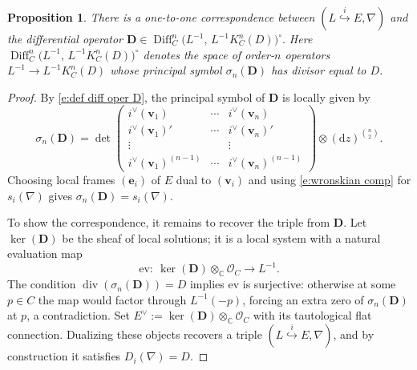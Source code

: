 \documentclass[twoside, 11pt]{article}
\numberwithin{equation}{section}
\theoremstyle{theorem}
\numberwithin{theorem}{section}
\newtheorem{proposition}[proposition]{Proposition}
\theoremstyle{definition}
\begin{document}
\begin{proposition}\label{SL diff oper}
There is a one-to-one correspondence between $(L \overset{i}{\hookrightarrow} E, \nabla)$ and the differential operator
\(
\mathbf{D}\in \operatorname{Diff}_C^{n} \bigl(L^{-1},\,L^{-1}K_C^{n}(D)\bigr)^\circ.
\)
Here $\operatorname{Diff}^{n}_{C} \bigl(L^{-1},\,L^{-1}K_C^{n}(D)\bigr)^{\circ}$ denotes the space of order-$n$ operators
$L^{-1}\to L^{-1}K_C^{n}(D)$
whose principal symbol $\sigma_n(\mathbf{D})$ has divisor equal to $D$.
\end{proposition}
\begin{proof}
By \eqref{e:def diff oper D}, the principal symbol of $\mathbf{D}$ is locally given by
\begin{equation}\label{eqn-principal-symbol}
\sigma_n(\mathbf{D})
=\det \begin{pmatrix}
i^\vee(\mathbf{v}_1) & \cdots & i^\vee(\mathbf{v}_n)\\
i^\vee(\mathbf{v}_1)' & \cdots & i^\vee(\mathbf{v}_n)'\\
\vdots & & \vdots\\
i^\vee(\mathbf{v}_1)^{(n-1)} & \cdots & i^\vee(\mathbf{v}_n)^{(n-1)}
\end{pmatrix}\otimes (\mathrm{d}z)^{\binom{n}{2}}.
\end{equation}
Choosing local frames $(\mathbf{e}_i)$ of $E$ dual to $(\mathbf{v}_i)$ and using \eqref{e:wronskian comp} for $s_i(\nabla)$ gives $\sigma_n(\mathbf{D})=s_i(\nabla)$. 

To show the correspondence, it remains to recover the triple from $\mathbf{D}$. Let $\ker(\mathbf{D})$ be the sheaf of local solutions; it is a local system with a natural evaluation map
\[
\mathrm{ev}:\ \ker(\mathbf{D})\otimes_{\mathbb{C}}\mathcal{O}_C \longrightarrow L^{-1}.
\]
The condition $\operatorname{div}(\sigma_n(\mathbf{D}))=D$ implies $\mathrm{ev}$ is surjective: otherwise at some $p\in C$ the map would factor through $L^{-1}(-p)$, forcing an extra zero of $\sigma_n(\mathbf{D})$ at $p$, a contradiction. Set $E^\vee:=\ker(\mathbf{D})\otimes_{\mathbb{C}}\mathcal{O}_C$ with its tautological flat connection. Dualizing these objects recovers a triple $(L \overset{i}{\hookrightarrow} E, \nabla)$, and by construction it satisfies $D_i(\nabla)=D$.
\end{proof}
\end{document}
